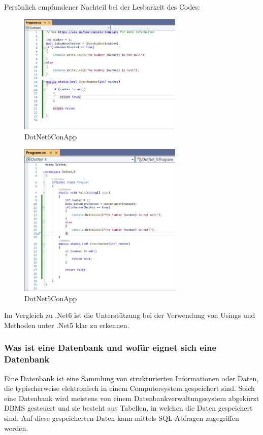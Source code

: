Persönlich empfundener Nachteil bei der Lesbarkeit des Codes:

\begin{figure}[H]
    \centering
    \includegraphics[width=0.7\textwidth]{./pics/DotNet6ConApp.JPG}
    \caption{DotNet6ConApp}
\end{figure}


\begin{figure}[H]
    \centering
    \includegraphics[width=0.7\textwidth]{./pics/DotNet5ConApp.JPG}
    \caption{DotNet5ConApp}
\end{figure}


Im Vergleich zu .Net6 ist die Unterstützung bei der Verwendung von Usings und Methoden unter .Net5 klar zu erkennen.


\subsubsection*{Was ist eine Datenbank und wofür eignet sich eine Datenbank}
Eine Datenbank ist eine Sammlung von strukturierten Informationen oder Daten, die typischerweise elektronisch in einem Computersystem gespeichert sind.
Solch eine Datenbank wird meistens von einem Datenbankverwaltungssystem abgekürzt DBMS gesteuert und sie besteht aus Tabellen, in welchen die Daten gespeichert sind.
Auf diese gespeicherten Daten kann mittels SQL-Abfragen zugegriffen werden.




